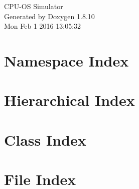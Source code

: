 \documentclass[twoside]{book}
\newcommand{\+}{\discretionary{\mbox{\scriptsize$\hookleftarrow$}}{}{}}
\newcommand{\clearemptydoublepage}{%
  \newpage{\pagestyle{empty}\cleardoublepage}%
}
\begin{document}
\hypersetup{pageanchor=false,
             bookmarks=true,
             bookmarksnumbered=true,
             pdfencoding=unicode
            }
\begin{titlepage}
\vspace*{7cm}
\begin{center}%
{\Large C\+P\+U-\/\+O\+S Simulator }\\
\vspace*{1cm}
{\large Generated by Doxygen 1.8.10}\\
\vspace*{0.5cm}
{\small Mon Feb 1 2016 13:05:32}\\
\end{center}
\end{titlepage}
\clearemptydoublepage
\tableofcontents
\clearemptydoublepage
{}
\hypersetup{pageanchor=true}

\chapter{Namespace Index}

\chapter{Hierarchical Index}

\chapter{Class Index}

\chapter{File Index}

\end{document}
